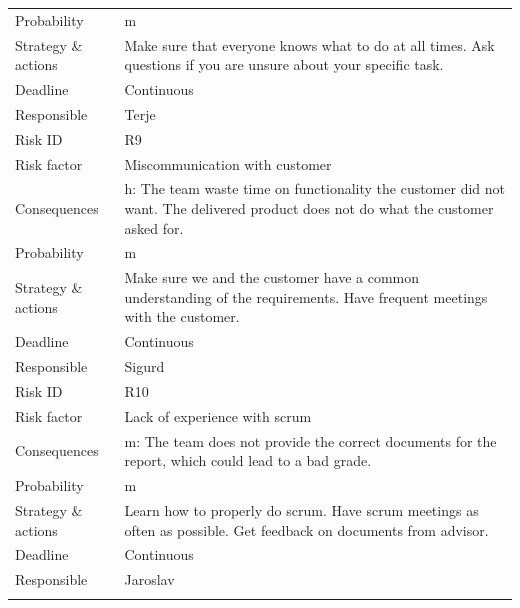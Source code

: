 \begin{longtable}{l p{9cm}}
	Probability & \Gls{m} \\ 
	Strategy \& actions & Make sure that everyone knows what to do at all times. Ask questions if you are unsure about your specific task. \\
	Deadline & Continuous \\
	Responsible & Terje \\
	\midrule
	Risk ID & R9 \\
	Risk factor & Miscommunication with customer \\
	Consequences & \Gls{h}: The team waste time on functionality the customer did not want. The delivered product does not do what the customer asked for. \\
	Probability & \Gls{m} \\ 
	Strategy \& actions & Make sure we and the customer have a common understanding of the requirements. Have frequent meetings with the customer.  \\
	Deadline & Continuous \\
	Responsible & Sigurd \\
	\midrule
	Risk ID & R10 \\
	Risk factor & Lack of experience with \Gls{scrum} \\
	Consequences & \Gls{m}: The team does not provide the correct documents for the report, which could lead to a bad grade. \\
	Probability & \Gls{m} \\ 
	Strategy \& actions & Learn how to properly do \Gls{scrum}. Have \Gls{scrum} meetings as often as possible. Get feedback on documents from advisor. \\
	Deadline & Continuous \\
	Responsible & Jaroslav \\
	\bottomrule
	\label{tab:risk}
\end{longtable}
